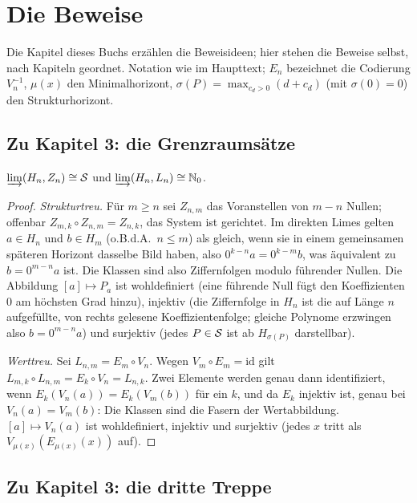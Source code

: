\chapter{Die Beweise}
\label{ch:anhang-beweise}

Die Kapitel dieses Buchs erzählen die Beweisideen; hier stehen die
Beweise selbst, nach Kapiteln geordnet. Notation wie im Haupttext;
$E_n$ bezeichnet die Codierung $V_n^{-1}$, $\mu(x)$ den
Minimalhorizont, $\sigma(P)=\max_{c_d>0}(d+c_d)$ (mit
$\sigma(0)=0$) den Strukturhorizont.

\section*{Zu Kapitel 3: die Grenzraumsätze}

\begin{satz}
$\varinjlim(H_n,Z_n)\cong\mathcal S$ und
$\varinjlim(H_n,L_n)\cong\mathbb N_0$.
\end{satz}

\begin{proof}
\emph{Strukturtreu.} Für $m\ge n$ sei $Z_{n,m}$ das Voranstellen von
$m-n$ Nullen; offenbar $Z_{m,k}\circ Z_{n,m}=Z_{n,k}$, das System
ist gerichtet. Im direkten Limes gelten $a\in H_n$ und $b\in H_m$
(o.B.d.A.\ $n\le m$) als gleich, wenn sie in einem gemeinsamen
späteren Horizont dasselbe Bild haben, also
$0^{k-n}a=0^{k-m}b$, was äquivalent zu $b=0^{m-n}a$ ist. Die
Klassen sind also Ziffernfolgen modulo führender Nullen. Die
Abbildung $[a]\mapsto P_a$ ist wohldefiniert (eine führende Null
fügt den Koeffizienten $0$ am höchsten Grad hinzu), injektiv (die
Ziffernfolge in $H_n$ ist die auf Länge $n$ aufgefüllte, von rechts
gelesene Koeffizientenfolge; gleiche Polynome erzwingen also
$b=0^{m-n}a$) und surjektiv (jedes $P\in\mathcal S$ ist ab
$H_{\sigma(P)}$ darstellbar).

\emph{Werttreu.} Sei $L_{n,m}=E_m\circ V_n$. Wegen
$V_m\circ E_m=\mathrm{id}$ gilt
$L_{m,k}\circ L_{n,m}=E_k\circ V_n=L_{n,k}$. Zwei Elemente werden
genau dann identifiziert, wenn $E_k(V_n(a))=E_k(V_m(b))$ für ein
$k$, und da $E_k$ injektiv ist, genau bei $V_n(a)=V_m(b)$: Die
Klassen sind die Fasern der Wertabbildung. $[a]\mapsto V_n(a)$ ist
wohldefiniert, injektiv und surjektiv (jedes $x$ tritt als
$V_{\mu(x)}(E_{\mu(x)}(x))$ auf).
\end{proof}

\section*{Zu Kapitel 3: die dritte Treppe}

